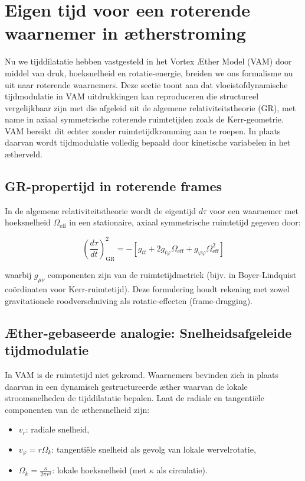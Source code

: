 \section{Eigen tijd voor een roterende waarnemer in ætherstroming}

Nu we tijddilatatie hebben vastgesteld in het Vortex Æther Model (VAM) door middel van druk, hoeksnelheid en rotatie-energie, breiden we ons formalisme nu uit naar roterende waarnemers. Deze sectie toont aan dat vloeistofdynamische tijdmodulatie in VAM uitdrukkingen kan reproduceren die structureel vergelijkbaar zijn met die afgeleid uit de algemene relativiteitstheorie (GR), met name in axiaal symmetrische roterende ruimtetijden zoals de Kerr-geometrie. VAM bereikt dit echter zonder ruimtetijdkromming aan te roepen. In plaats daarvan wordt tijdmodulatie volledig bepaald door kinetische variabelen in het ætherveld.

\subsection{GR-propertijd in roterende frames}

In de algemene relativiteitstheorie wordt de eigentijd \(d\tau\) voor een waarnemer met hoeksnelheid \(\Omega_\text{eff}\) in een stationaire, axiaal symmetrische ruimtetijd gegeven door:

\begin{equation}
\left( \frac{d\tau}{dt} \right)^2_\text{GR} = -\left[ g_{tt} + 2g_{t\varphi} \Omega_\text{eff} + g_{\varphi\varphi} \Omega_\text{eff}^2 \right]
\label{eq:GR_proper_time}
\end{equation}

waarbij \(g_{\mu\nu}\) componenten zijn van de ruimtetijdmetriek (bijv. in Boyer-Lindquist coördinaten voor Kerr-ruimtetijd). Deze formulering houdt rekening met zowel gravitationele roodverschuiving als rotatie-effecten (frame-dragging).

\subsection{Æther-gebaseerde analogie: Snelheidsafgeleide tijdmodulatie}

In VAM is de ruimtetijd niet gekromd. Waarnemers bevinden zich in plaats daarvan in een dynamisch gestructureerde æther waarvan de lokale stroomsnelheden de tijddilatatie bepalen. Laat de radiale en tangentiële componenten van de æthersnelheid zijn:

\begin{itemize}
\item \(v_r\): radiale snelheid,
\item \(v_\varphi = r\Omega_k\): tangentiële snelheid als gevolg van lokale wervelrotatie,
\item \(\Omega_k = \frac{\kappa}{2\pi r^2}\): lokale hoeksnelheid (met \(\kappa\) als circulatie).
\end{itemize}

